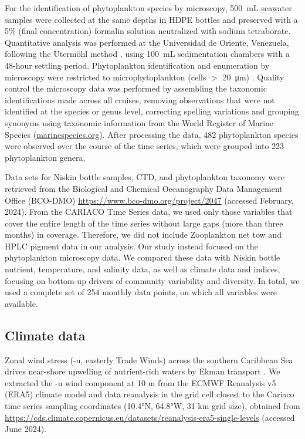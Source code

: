 \documentclass[draft]{agujournal2019}
\begin{document}
    For the identification of phytoplankton species by microscopy, \qty{500}{\milli\liter} seawater samples were collected at the same depths in HDPE bottles and preserved with a 5\% (final concentration) formalin solution neutralized with sodium tetraborate. Quantitative analysis was performed at the Universidad de Oriente, Venezuela, following the Utermöhl method \cite{hasle1978inverted}, using \qty{100}{\milli\liter} sedimentation chambers with a 48-hour settling period. Phytoplankton identification and enumeration by microscopy were restricted to microphytoplankton (cells $>$ \qty{20}{\micro \meter}) \cite{mutshinda_environmental_2013}.
    Quality control the microscopy data was performed by assembling the taxonomic identifications made across all cruises, removing observations that were not identified at the species or genus level, correcting spelling variations and grouping synonyms using taxonomic information from the World Register of Marine Species (\url{marinespecies.org}). After processing the data, 482 phytoplankton species were observed over the course of the time series, which were grouped into 223 phytoplankton genera.

    
    Data sets for Niskin bottle samples, CTD, and phytoplankton taxonomy were retrieved from the Biological and Chemical Oceanography Data Management Office (BCO-DMO) \url{https://www.bco-dmo.org/project/2047} (accessed February, 2024). 
    From the CARIACO Time Series data, we used only those variables that cover the entire length of the time series without large gaps (more than three months) in coverage. Therefore, we did not include Zooplankton net tow and HPLC pigment data in our analysis. Our study instead focused on the phytoplankton microscopy data. We compared these data with Niskin bottle nutrient, temperature, and salinity data, as well as climate data and indices, focusing on bottom-up drivers of community variability and diversity. In total, we used a complete set of 254 monthly data points, on which all variables were available.


\subsection{Climate data}
    Zonal wind stress (-u, easterly Trade Winds) across the southern Caribbean Sea drives near-shore upwelling of nutrient-rich waters by Ekman transport \cite{taylor_ecosystem_2012}. We extracted the -u wind component at 10 m from the ECMWF Reanalysis v5 (ERA5) climate model and data reanalysis in the grid cell closest to the Cariaco time series sampling coordinates (\ang{10.4}N, \ang{64.8}W, 31 km grid size), obtained from \url{https://cds.climate.copernicus.eu/datasets/reanalysis-era5-single-levels} (accessed June 2024).
    
\end{document}
